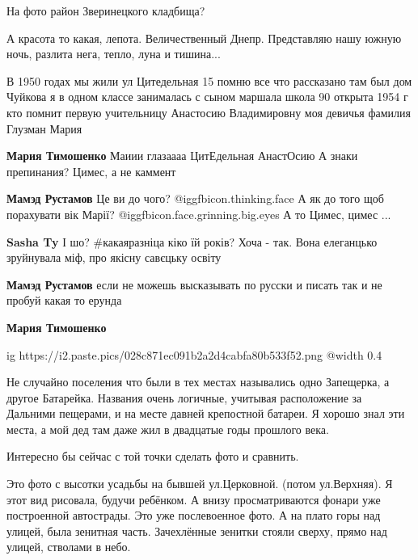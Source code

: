 \begin{itemize}
\begin{itemize}
\end{itemize} %

На фото район Зверинецкого кладбища?

А красота то какая, лепота. Величественный Днепр. Представляю нашу южную ночь,
разлита нега, тепло, луна и тишина...


В 1950 годах мы жили ул Цитедельная 15 помню все что рассказано там был дом
Чуйкова я в одном классе занималась с сыном маршала школа 90 открыта 1954 г кто
помнит первую учительницу Анастосию Владимировну моя девичья фамилия Глузман
Мария

\begin{itemize} %
\textbf{Мария Тимошенко}
Маиии глазаааа
ЦитЕдельная
АнастОсию
А знаки препинания?
Цимес, а не каммент

\begin{itemize} %
\textbf{Мамэд Рустамов}
Це ви до чого?  @igg{fbicon.thinking.face} 
А як до того щоб порахувати вік Марії? @igg{fbicon.face.grinning.big.eyes} 
А то Цимес, цимес ...

\textbf{Sasha Ty}
І шо?
\#какаяразніца кіко їй років?
Хоча - так.
Вона елеганцько зруйнувала міф, про якісну савєцьку освіту

\textbf{Мамэд Рустамов} если не можешь высказывать по русски и писать так и не пробуй какая то ерунда

\textbf{Мария Тимошенко}

\ifcmt
  ig https://i2.paste.pics/028c871ec091b2a2d4cabfa80b533f52.png
  @width 0.4
\fi

\end{itemize} %

\end{itemize} %


Не случайно поселения что были в тех местах назывались одно Запещерка, а другое
Батарейка. Названия очень логичные, учитывая расположение за Дальними пещерами, и
на месте давней крепостной батареи. Я хорошо знал эти места, а мой дед там даже
жил в двадцатые годы прошлого века.


Интересно бы сейчас с той точки сделать фото и сравнить.


Это фото с высотки усадьбы на бывшей ул.Церковной. (потом ул.Верхняя). Я этот
вид рисовала, будучи ребёнком. А внизу просматриваются фонари уже построенной
автострады. Это уже послевоенное фото. А на плато горы над улицей, была
зенитная часть. Зачехлённые зенитки стояли сверху, прямо над улицей, стволами в
небо.


\end{itemize}
